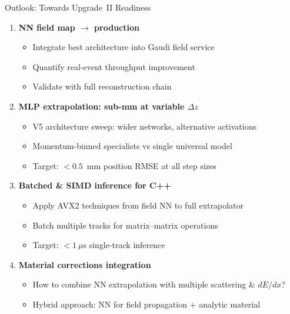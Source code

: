 \documentclass[aspectratio=169, 11pt]{beamer}
\newcommand{\dz}{\Delta z}
\begin{document}
\begin{frame}{Outlook: Towards Upgrade~II Readiness}

\begin{enumerate}
  \item \textbf{NN field map $\to$ production}
  \begin{itemize}\small
    \item Integrate best architecture into Gaudi field service
    \item Quantify real-event throughput improvement
    \item Validate with full reconstruction chain
  \end{itemize}

  \vspace{4pt}
  \item \textbf{MLP extrapolation: sub-mm at variable $\dz$}
  \begin{itemize}\small
    \item V5 architecture sweep: wider networks, alternative activations
    \item Momentum-binned specialists vs single universal model
    \item Target: $< 0.5$~mm position RMSE at all step sizes
  \end{itemize}

  \vspace{4pt}
  \item \textbf{Batched \& SIMD inference for C++}
  \begin{itemize}\small
    \item Apply AVX2 techniques from field NN to full extrapolator
    \item Batch multiple tracks for matrix--matrix operations
    \item Target: $< 1~\mu$s single-track inference
  \end{itemize}

  \vspace{4pt}
  \item \textbf{Material corrections integration}
  \begin{itemize}\small
    \item How to combine NN extrapolation with multiple scattering \& $dE/dx$?
    \item Hybrid approach: NN for field propagation + analytic material
  \end{itemize}
\end{enumerate}
\end{frame}
\end{document}
